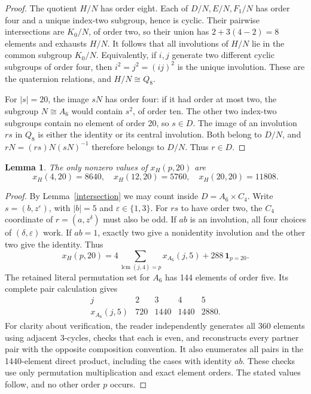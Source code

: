 \documentclass[11pt,a4paper]{article}
\newtheorem{lemma}{Lemma}\newtheorem{theorem}{Theorem}
\begin{document}
\begin{proof}
The quotient $H/N$ has order eight. Each of $D/N,E/N,F_1/N$ has
order four and a unique index-two subgroup, hence is cyclic.
Their pairwise intersections are $K_0/N$, of order two, so their
union has $2+3(4-2)=8$ elements and exhausts $H/N$. It follows that
all involutions of $H/N$ lie in the common subgroup $K_0/N$. Equivalently,
if $i,j$ generate two different cyclic subgroups of order four, then
$i^2=j^2=(ij)^2$ is the unique involution. These are the quaternion
relations, and $H/N\cong Q_8$.

For $|s|=20$, the image $sN$ has order four: if it had order at most
two, the subgroup $N\cong A_6$ would contain $s^2$, of order ten.
The other two index-two subgroups contain no element of order 20,
so $s\in D$. The image of an involution $rs$ in $Q_8$ is either the
identity or its central involution. Both belong to $D/N$, and
$rN=(rs)N(sN)^{-1}$ therefore belongs to $D/N$. Thus $r\in D$.
\end{proof}

\begin{lemma}\label{literal}
The only nonzero values of $x_H(p,20)$ are
\[
           x_H(4,20)=8640,\quad x_H(12,20)=5760,
           \quad x_H(20,20)=11808.
\]
\end{lemma}
\begin{proof}
By Lemma~\ref{intersection} we may count inside $D=A_6\times C_4$.
Write $s=(b,z^\varepsilon)$, with $|b|=5$ and
$\varepsilon\in\{1,3\}$. For $rs$ to have order two, the $C_4$
coordinate of $r=(a,z^\delta)$ must also be odd. If $ab$ is an
involution, all four choices of $(\delta,\varepsilon)$ work.
If $ab=1$, exactly two give a nonidentity involution and the other
two give the identity. Thus
\[
 x_H(p,20)=4\!\sum_{\operatorname{lcm}(j,4)=p}x_{A_6}(j,5)
               +288\,\mathbf1_{p=20}.
\]
The retained literal permutation set for $A_6$ has 144 elements of
order five. Its complete pair calculation gives
\[
\begin{array}{c|rrrr}
j&2&3&4&5\\\hline
x_{A_6}(j,5)&720&1440&1440&2880.
\end{array}
\]
For clarity about verification, the reader independently generates
all 360 elements using adjacent 3-cycles, checks that each is even,
and reconstructs every partner pair with the opposite composition
convention. It also enumerates all pairs in the 1440-element direct
product, including the cases with identity $ab$. These checks use
only permutation multiplication and exact element orders. The
stated values follow, and no other order $p$ occurs.
\end{proof}
\end{document}
